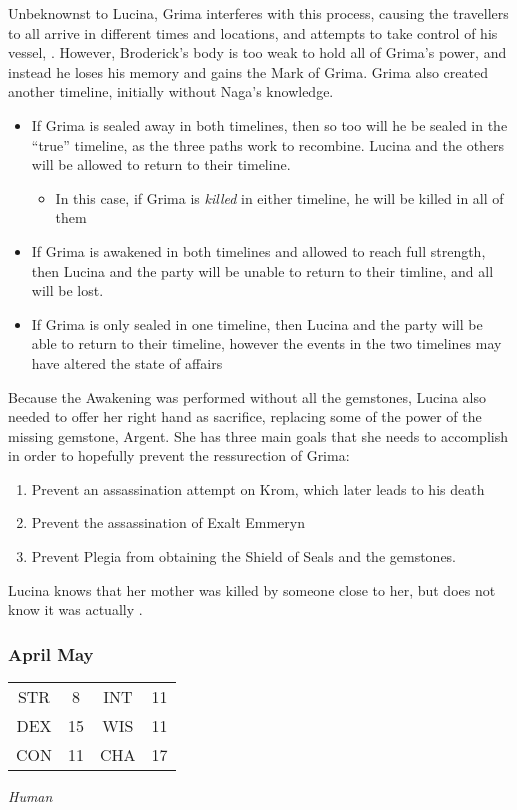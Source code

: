Unbeknownst to Lucina, Grima interferes with this process, causing the travellers to all arrive in different times and locations, and attempts to take control of his vessel, . However, Broderick's body is too weak to hold all of Grima's power, and instead he loses his memory and gains the Mark of Grima. Grima also created another timeline, initially without Naga's knowledge. 
\begin{itemize}
\item If Grima is sealed away in both timelines, then so too will he be sealed in the ``true'' timeline, as the three paths work to recombine. Lucina and the others will be allowed to return to their timeline.
\begin{itemize}
\item In this case, if Grima is \textit{killed} in either timeline, he will be killed in all of them
\end{itemize}
\item If Grima is awakened in both timelines and allowed to reach full strength, then Lucina and the party will be unable to return to their timline, and all will be lost.
\item If Grima is only sealed in one timeline, then Lucina and the party will be able to return to their timeline, however the events in the two timelines may have altered the state of affairs
\end{itemize}

Because the Awakening was performed without all the gemstones, Lucina also needed to offer her right hand as sacrifice, replacing some of the power of the missing gemstone, Argent. She has three main goals that she needs to accomplish in order to hopefully prevent the ressurection of Grima:
\begin{enumerate}
\item Prevent an assassination attempt on Krom, which later leads to his death
\item Prevent the assassination of Exalt Emmeryn
\item Prevent Plegia from obtaining the Shield of Seals and the gemstones.
\end{enumerate}

Lucina knows that her mother was killed by someone close to her, but does not know it was actually .

\subsubsection{April May}
\label{people:aprilmay}
\begin{center}
\begin{tabular}{c c|c c}
STR & 8 & INT & 11\\
DEX & 15 & WIS & 11 \\
CON & 11 & CHA & 17 \end{tabular}\end{center}
\textit{Human}\\

